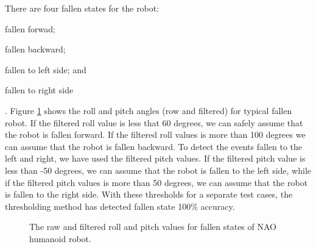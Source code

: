 \documentclass[letterpaper]{article}
\begin{document}
There are four fallen states for the robot: \begin{inparaenum}[(1)] \item fallen
forwad; \item fallen backward; \item fallen to left side; and \item fallen to right
side\end{inparaenum}. Figure \ref{fig:fallenBehavior} shows the roll and pitch angles (row and
filtered) for typical fallen robot. If the filtered roll value is less that 60 degrees, we can
safely assume that the robot is fallen forward. If the filtered roll values is more than 100
degrees we can assume that the robot is fallen backward. To detect the events fallen to the left
and right, we have used the filtered pitch values. If the filtered pitch value is less than -50
degrees, we can assume that the robot is fallen to the left side, while if the filtered pitch
values is more than 50 degrees, we can assume that the robot is fallen to the right side. With
these thresholds for a separate test cases, the thresholding method has detected fallen state 100\%
accuracy. 

\begin{figure}[!ht]
  \centering
  \caption{The raw and filtered roll and pitch values for fallen states of NAO humanoid robot.}
  \label{fig:fallenBehavior}

\end{figure}
\end{document}
